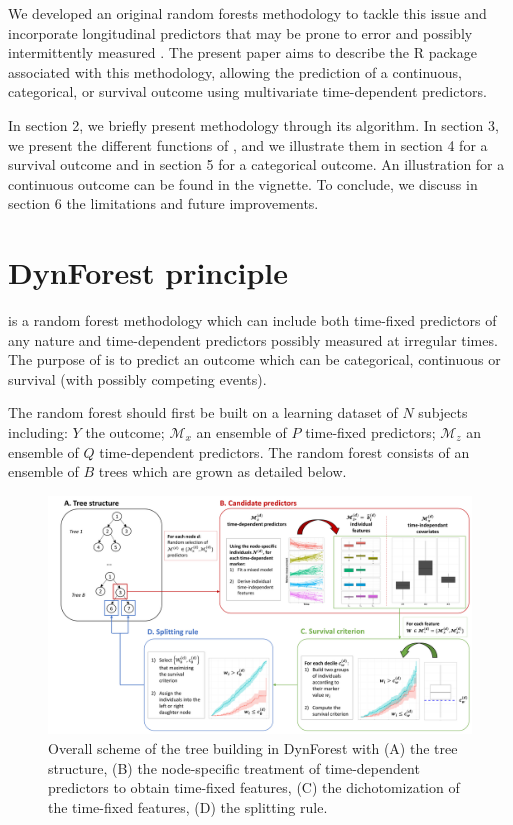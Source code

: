 We developed an original random forests methodology to tackle this issue and incorporate longitudinal predictors that may be prone to error and possibly intermittently measured \citep{devaux_random_2023}. The present paper aims to describe the  R package associated with this methodology, allowing the prediction of a continuous, categorical, or survival outcome using multivariate time-dependent predictors.

In section 2, we briefly present  methodology through its algorithm. In section 3, we present the different functions of , and we illustrate them in section 4 for a survival outcome and in section 5 for a categorical outcome. An illustration for a continuous outcome can be found in the  vignette. To conclude, we discuss in section 6 the limitations and future improvements.

\section{DynForest principle}\label{dynforest-principle}

 is a random forest methodology which can include both time-fixed predictors of any nature and time-dependent predictors possibly measured at irregular times. The purpose of  is to predict an outcome which can be categorical, continuous or survival (with possibly competing events).

The random forest should first be built on a learning dataset of \(N\) subjects including: \(Y\) the outcome; \(\mathcal{M}_x\) an ensemble of \(P\) time-fixed predictors; \(\mathcal{M}_z\) an ensemble of \(Q\) time-dependent predictors. The random forest consists of an ensemble of \(B\) trees which are grown as detailed below.

\begin{figure}

{\centering \includegraphics[width=1\linewidth,height=0.3\textheight]{figures/dynforestR_graph}

}

\caption{Overall scheme of the tree building in DynForest with (A) the tree structure, (B) the node-specific treatment of time-dependent predictors to obtain time-fixed features, (C) the dichotomization of the time-fixed features, (D) the splitting rule.}\label{fig:dynforestRgraph}
\end{figure}


